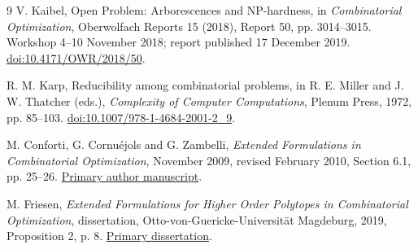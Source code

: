 \documentclass[11pt]{article}
\begin{document}
\begin{thebibliography}{9}
V. Kaibel, Open Problem: Arborescences and NP-hardness, in
\emph{Combinatorial Optimization}, Oberwolfach Reports 15 (2018),
Report 50, pp. 3014--3015. Workshop 4--10 November 2018;
report published 17 December 2019.
\href{https://doi.org/10.4171/OWR/2018/50}{doi:10.4171/OWR/2018/50}.

R. M. Karp, Reducibility among combinatorial problems, in
R. E. Miller and J. W. Thatcher (eds.), \emph{Complexity of Computer
Computations}, Plenum Press, 1972, pp. 85--103.
\href{https://doi.org/10.1007/978-1-4684-2001-2_9}{doi:10.1007/978-1-4684-2001-2\_9}.

M. Conforti, G. Cornu\'ejols and G. Zambelli,
\emph{Extended Formulations in Combinatorial Optimization},
November 2009, revised February 2010, Section 6.1, pp. 25--26.
\href{https://www.andrew.cmu.edu/user/gc0v/webpub/ExtFor-Feb2010.pdf}{Primary author manuscript}.

M. Friesen, \emph{Extended Formulations for Higher Order Polytopes in
Combinatorial Optimization}, dissertation, Otto-von-Guericke-Universit\"at
Magdeburg, 2019, Proposition 2, p. 8.
\href{https://d-nb.info/1219966134/34}{Primary dissertation}.
\end{thebibliography}
\end{document}
